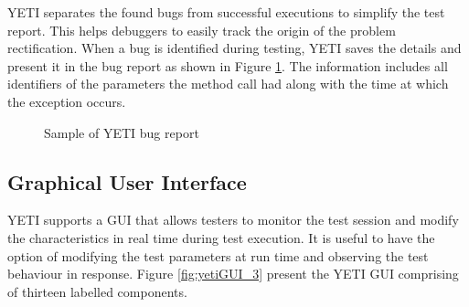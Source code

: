 YETI separates the found bugs from successful executions to simplify the test report. This helps debuggers to easily track the origin of the problem rectification. When a bug is identified during testing, YETI saves the details and present it in the bug report as shown in Figure \ref{bugReport}. The information includes all identifiers of the parameters the method call had along with the time at which the exception occurs.
\bigskip
\begin{figure}[H]
	\centering
	\smallskip
	\caption{Sample of YETI bug report}
	\label{bugReport}
\end{figure}

\subsection{Graphical User Interface}
YETI supports a GUI that allows testers to monitor the test session and modify the characteristics in real time during test execution. It is useful to have the option of modifying the test parameters at run time and observing the test behaviour in response. Figure \ref{fig:yetiGUI_3} present the YETI GUI comprising of thirteen labelled components.


